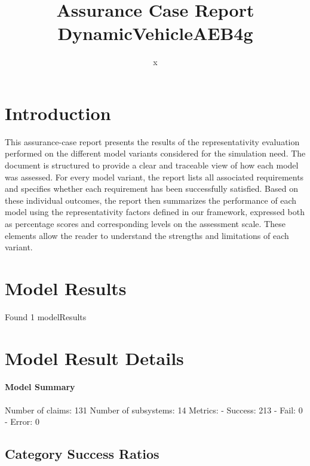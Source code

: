 \documentclass{article}
\title{Assurance Case Report DynamicVehicleAEB4g}
\author{x}
\begin{document}
	\maketitle
	\section{Introduction}
	This assurance-case report presents the results of the 
	representativity evaluation performed on the different model variants considered for 
	the simulation need. The document is structured to provide a clear and traceable view of how 
	each model was assessed. For every model variant, the report lists all associated requirements
	 and specifies whether each requirement has been successfully satisfied. Based on these 
	individual outcomes, the report then summarizes the performance of each model using the 
	representativity factors defined in our framework, expressed both as percentage scores 
	and corresponding levels on the assessment scale. These elements allow the reader to understand 
	the strengths and limitations of each variant.
	 
	\section{Model Results}
    Found 1 modelResults
		
			\section{Model Result Details} 
			\paragraph{Model Summary}
			Number of claims: 131
			Number of subsystems: 14
			Metrics:
			- Success: 213
			- Fail: 0
			- Error: 0
			
	

					\subsection{Category Success Ratios}
						
\end{document}
